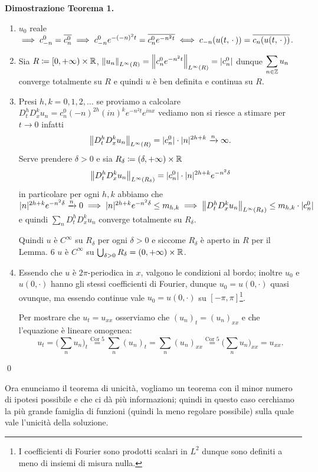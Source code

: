 \textbf{Dimostrazione Teorema 1.}
\begin{enumerate}
	\item $u_0$ reale $\implies c_{-n}^0 = \overline{c_n^0} \implies c_{-n}^0 e^{-(-n)^2 t} = \overline{c_n^0 e^{-n^2 t}} \iff c_{-n}(u(t, \,\cdot\,)) = \overline{c_{n}(u(t, \,\cdot\,))}$.

	\item Sia $R \coloneqq [0, +\infty) \times \mathbb R$, $\left\lVert u_n \right\rVert_{L^\infty(R)} = \left\lVert c_n^0 e^{-n^2 t} \right\rVert_{L^\infty (R)} =  |c_n^0|$ dunque
		$\displaystyle\sum_{n \in \mathbb Z} u_n$ converge totalmente su $R$ e quindi $u$ è ben definita e continua su $R$.

	\item Presi $h, k = 0, 1, 2, \dots$ se proviamo a calcolare $D_t^h D_x^k u_n = c_n^0 (-n)^{2h} (in)^k e^{-n^2 t} e^{inx}$ vediamo non si riesce a stimare per $t \to 0$ infatti
		$$
		\left\lVert D_t^h D_x^k u_n \right\rVert_{L^\infty(R)}
		= |c_n^0| \cdot |n|^{2h + k} \xrightarrow{n} \infty.
		$$
		Serve prendere $\delta > 0$ e sia $R_\delta \coloneqq (\delta, +\infty) \times \mathbb R$
		$$
		\left\lVert D_t^h D_x^k u_n \right\rVert_{L^\infty(R_\delta)}
		= |c_n^0| \cdot |n|^{2h + k} e^{-n^2 \delta}
		$$
		in particolare per ogni $h, k$ abbiamo che $|n|^{2h + k} e^{-n^2 \delta} \xrightarrow{n} 0 \implies |n|^{2h + k} e^{-n^2 \delta} \leq m_{h,k} \implies \left\lVert D_t^h D_x^k u_n \right\rVert_{L^\infty(R_\delta)} \leq m_{h,k} \cdot |c_n^0|$ e quindi $\sum_n D_t^h D_x^k u_n$ converge totalmente su $R_\delta$.

		Quindi $u$ è $C^\infty$ su $R_\delta$ per ogni $\delta > 0$ e siccome $R_\delta$ è aperto in $R$ per il Lemma. 6 $u$ è $C^\infty$ su $\bigcup_{\delta > 0} R_\delta = (0, +\infty) \times \mathbb R$.

	\item Essendo che $u$ è $2\pi$-periodica in $x$, valgono le condizioni al bordo; inoltre $u_0$ e $u(0,\cdot)$ hanno gli stessi coefficienti di Fourier, dunque $u_0 = u(0,\cdot)$ quasi ovunque, ma essendo continue vale $u_0 = u(0,\cdot)$ su $[-\pi,\pi]$\footnote{I coefficienti di Fourier sono prodotti scalari in $L^2$ dunque sono definiti a meno di insiemi di misura nulla.}.

	Per mostrare che $u_t = u_{xx}$ osserviamo che $(u_n)_t = (u_n)_{xx}$ e che l'equazione è lineare omogenea:
	$$
		u_t = \Big(\sum_n u_n\Big)_t \overset{\text{Cor 5}}{=} \sum_n (u_n)_t = \sum_n (u_n)_{xx} \overset{\text{Cor 5}}{=} \Big( \sum_n u_n \Big)_{xx} = u_{xx}.
	$$
\end{enumerate}
\qed

Ora enunciamo il teorema di unicità, vogliamo un teorema con il minor numero di ipotesi possibile e che ci dà più informazioni; quindi in questo caso cerchiamo la più grande famiglia di funzioni (quindi la meno regolare possibile) sulla quale vale l'unicità della soluzione.

